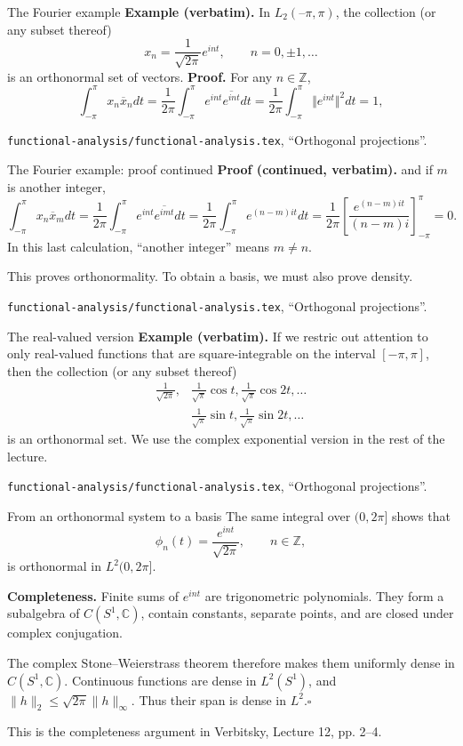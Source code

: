 \documentclass[aspectratio=169,11pt]{beamer}
\newcommand{\C}{\mathbb C}
\newcommand{\Z}{\mathbb Z}
\newcommand{\src}[1]{\par\vfill{\scriptsize #1\par}}
\begin{document}
\begin{frame}{The Fourier example}
\textbf{Example (verbatim).}
In $L_2(–\pi,\pi)$, the collection (or any subset thereof)
			\[x_n=\frac{1}{\sqrt{2\pi}}e^{int},\qquad n=0,\pm1,\ldots\]
			is an orthonormal set of vectors.
\textbf{Proof.}
For any $n\in\Z$,
				\[\int_{-\pi}^\pi x_n\overline{x}_ndt=\frac{1}{2\pi}\int_{-\pi}^\pi e^{int}\overline{e^{int}}dt=\frac{1}{2\pi}\int_{-\pi}^\pi \Vert e^{int}\Vert^2dt=1,\]
\src{\texttt{functional-analysis/functional-analysis.tex}, ``Orthogonal projections''.}
\end{frame}

\begin{frame}{The Fourier example: proof continued}
\textbf{Proof (continued, verbatim).}
\begingroup\small
and if $m$ is another integer,
				\[\int_{-\pi}^\pi x_n\overline{x}_mdt=\frac{1}{2\pi}\int_{-\pi}^\pi e^{int}\overline{e^{imt}}dt=\frac{1}{2\pi}\int_{-\pi}^\pi e^{(n-m)it}dt=\frac{1}{2\pi}\left[\frac{e^{(n-m)it}}{(n-m)i}\right]_{-\pi}^\pi=0.\]
\endgroup
\medskip
In this last calculation, ``another integer'' means $m\ne n$.

This proves orthonormality. To obtain a basis, we must also prove density.
\src{\texttt{functional-analysis/functional-analysis.tex}, ``Orthogonal projections''.}
\end{frame}

\begin{frame}{The real-valued version}
\textbf{Example (verbatim).}
If we restric out attention to only real-valued functions that are square-integrable on the interval $[-\pi,\pi]$, then the collection (or any subset thereof)
			\begin{align*}
				\frac{1}{\sqrt{2\pi}},&\frac{1}{\sqrt{\pi}}\cos t,\frac{1}{\sqrt{\pi}}\cos 2t,\ldots\\
				&\frac{1}{\sqrt{\pi}}\sin t,\frac{1}{\sqrt{\pi}}\sin 2t,\ldots
			\end{align*}
			is an orthonormal set.
\medskip
We use the complex exponential version in the rest of the lecture.
\src{\texttt{functional-analysis/functional-analysis.tex}, ``Orthogonal projections''.}
\end{frame}

\begin{frame}{From an orthonormal system to a basis}
The same integral over $(0,2\pi]$ shows that
\[
 \phi_n(t)=\frac{e^{int}}{\sqrt{2\pi}},\qquad n\in\Z,
\]
is orthonormal in $L^2(0,2\pi]$.

\textbf{Completeness.} Finite sums of $e^{int}$ are trigonometric
polynomials. They form a subalgebra of $C(S^1,\C)$, contain constants,
separate points, and are closed under complex conjugation.

The complex Stone--Weierstrass theorem therefore makes them uniformly
dense in $C(S^1,\C)$. Continuous functions are dense in $L^2(S^1)$,
and $\|h\|_2\leq\sqrt{2\pi}\|h\|_\infty$.
Thus their span is dense in $L^2$.\hfill$\square$
\src{This is the completeness argument in Verbitsky, Lecture 12, pp. 2--4.}
\end{frame}
\end{document}

